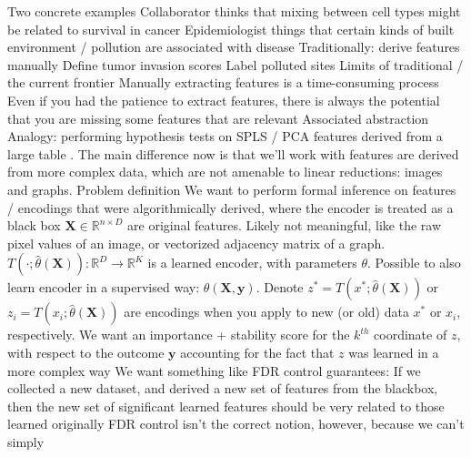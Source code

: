 \documentclass[11pt]{article}
\title{}
\author{Kris Sankaran}
\begin{document}
\maketitle

\begin{outline}
\1 Two concrete examples
  \2 Collaborator thinks that mixing between cell types might be related to
  survival in cancer
  \2 Epidemiologist things that certain kinds of built environment / pollution
  are associated with disease
  \2 Traditionally: derive features manually
    \3 Define tumor invasion scores
    \3 Label polluted sites
  \2 Limits of traditional / the current frontier
    \3 Manually extracting features is a time-consuming process
    \3 Even if you had the patience to extract features, there is always the
    potential that you are missing some features that are relevant
\1 Associated abstraction
  \2 Analogy: performing hypothesis tests on SPLS / PCA features derived from a
  large table \citep{rao1955estimation, elguero1988confidence}.
    \3 The main difference now is that we'll work with features are derived from
    more complex data, which are not amenable to linear reductions: images and
    graphs.
  \2 Problem definition
    \3 We want to perform formal inference on features / encodings that were
    algorithmically derived, where the encoder is treated as a black box
      \4 $\mathbf{X} \in \mathbb{R}^{n \times D}$ are original features. Likely
      not meaningful, like the raw pixel values of an image, or vectorized
      adjacency matrix of a graph.
      \4 $T\left(\cdot; \hat{\theta}\left(\mathbf{X}\right)\right) :
      \mathbb{R}^{D} \to \mathbb{R}^{K}$ is a learned encoder, with parameters
      $\theta$. Possible to also learn encoder in a supervised way:
      $\theta\left(\mathbf{X}, \mathbf{y}\right)$.
      \4 Denote $z^{\ast} = T\left(x^{\ast};
      \hat{\theta}\left(\mathbf{X}\right)\right)$ or $z_{i} = T\left(x_{i};
      \hat{\theta}\left(\mathbf{X}\right)\right)$ are encodings when you apply
      to new (or old) data $x^\ast$ or $x_{i}$, respectively.
      \4 We want an importance + stability score for the $k^{th}$ coordinate of
      $z$, with respect to the outcome $\mathbf{y}$ accounting for the fact that
      $z$ was learned in a more complex way
    \3 We want something like FDR control guarantees: If we collected a new
    dataset, and derived a new set of features from the blackbox, then the new
    set of significant learned features should be very related to those learned
    originally
      \4 FDR control isn't the correct notion, however, because we can't simply

\end{outline}
\end{document}

